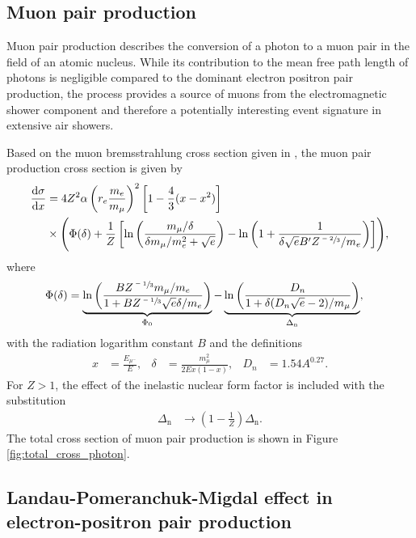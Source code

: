 \subsection{Muon pair production}

Muon pair production describes the conversion of a photon to a muon pair in the field of an atomic nucleus.
While its contribution to the mean free path length of photons is negligible compared to the dominant electron positron pair production, the process provides a source of muons from the electromagnetic shower component and therefore a potentially interesting event signature in extensive air showers.

Based on the muon bremsstrahlung cross section given in \cite{Kelner:288828}, the muon pair production cross section is given by
%
\begin{align}
	\begin{split}
		\frac{\mathrm{d}\sigma}{\mathrm{d}x} &= 4 Z^2 \alpha \left( r_e \frac{m_e}{m_\mu} \right)^2 \left[ 1 - \frac{4}{3} (x - x^2) \right] \\ &\times \Biggl( \Phi(\delta) + \frac{1}{Z} \left[ \ln\left( \frac{m_\mu / \delta}{\delta m_\mu / m_e^2 + \sqrt{e}} \right) - \ln\left( 1 + \frac{1}{\delta \sqrt{e} B^\prime Z^{\sfrac{-2}{3}} / m_e} \right) \right] \Biggr),
	\end{split}
\end{align}
%
where
%
\begin{align}
	\Phi(\delta) &= \underbrace{\ln \left( \frac{B Z^{\sfrac{-1}{3}} m_\mu / m_e}{1 + B Z^{\sfrac{-1}{3}} \sqrt{e} \delta / m_e } \right)}_{\Phi_0} - \underbrace{\ln\left( \frac{D_n}{1 + \delta (D_n \sqrt{e} - 2) / m_\mu} \right)}_{\Delta_\text{n}},
\end{align}
%
with the radiation logarithm constant $B$ and the definitions
%
\begin{align}
	x &= \frac{E_{\mu^-}}{E}, & \delta &= \frac{m_\mu^2}{2 E x (1 - x)}, & D_n &= 1.54 A^{0.27}.
\end{align}
%
For $Z > 1$, the effect of the inelastic nuclear form factor is included with the substitution
%
\begin{align}
	\Delta_\text{n} &\rightarrow \left( 1 - \frac{1}{Z} \right) \Delta_\text{n}.
\end{align}
%
The total cross section of muon pair production is shown in Figure \ref{fig:total_cross_photon}.

\subsection{Landau-Pomeranchuk-Migdal effect in electron-positron pair production}

